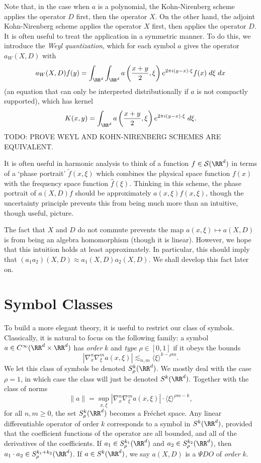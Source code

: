 Note that, in the case when $a$ is a polynomial, the Kohn-Nirenberg scheme applies the operator $D$ first, then the operator $X$. On the other hand, the adjoint Kohn-Nirenberg scheme applies the operator $X$ first, then applies the operator $D$. It is often useful to treat the application in a symmetric manner. To do this, we introduce the \emph{Weyl quantization}, which for each symbol $a$ gives the operator $a_W(X,D)$ with
%
\[ a_W(X,D) f(y) = \int_{\RR^d} \int_{\RR^d} a \left( \frac{x + y}{2}, \xi \right) e^{2 \pi i (y - x) \cdot \xi} f(x) \; d\xi\; dx \]
%
(an equation that can only be interpreted distributionally if $a$ is not compactly supported), which has kernel
%
\[ K(x,y) = \int_{\RR^d} a \left( \frac{x + y}{2}, \xi \right) e^{2 \pi i (y - x) \cdot \xi}\; d\xi. \]
%
TODO: PROVE WEYL AND KOHN-NIRENBERG SCHEMES ARE EQUIVALENT.

It is often useful in harmonic analysis to think of a function $f \in \mathcal{S}(\RR^d)$ in terms of a `phase portrait' $\tilde{f}(x,\xi)$ which combines the physical space function $f(x)$ with the frequency space function $\widehat{f}(\xi)$. Thinking in this scheme, the phase portrait of $a(X,D) f$ should be approximately $a(x,\xi) f(x,\xi)$, though the uncertainty principle prevents this from being much more than an intuitive, though useful, picture.

The fact that $X$ and $D$ do not commute prevents the map $a(x,\xi) \mapsto a(X,D)$ is from being an algebra homomorphism (though it is linear). However, we hope that this intuition holds at least approximately. In particular, this should imply that $(a_1a_2)(X,D) \approx a_1(X,D) a_2(X,D)$. We shall develop this fact later on.

\section{Symbol Classes}

To build a more elegant theory, it is useful to restrict our class of symbols. Classically, it is natural to focus on the following family: a symbol $a \in C^\infty(\RR^d \times \RR^d)$ has \emph{order} $k$ and \emph{type} $\rho \in [0,1]$ if it obeys the bounds
%
\[ |\nabla_x^n \nabla_\xi^m a(x,\xi)| \lesssim_{n,m} \langle \xi \rangle^{k - \rho m}. \]
%
We let this class of symbols be denoted $S_\rho^k(\RR^d)$. We mostly deal with the case $\rho = 1$, in which case the class will just be denoted $S^k(\RR^d)$. Together with the class of norms
%
\[ \| a \| = \sup_{x,\xi} |\nabla_x^n \nabla_\xi^m a(x,\xi)| \cdot \langle \xi \rangle^{\rho m - k}, \]
%
for all $n,m \geq 0$, the set $S^k_\rho(\RR^d)$ becomes a Fr\'{e}chet space. Any linear differentiable operator of order $k$ corresponds to a symbol in $S^k(\RR^d)$, provided that the coefficient functions of the operator are all bounded, and all of the derivatives of the coefficients. If $a_1 \in S^{k_1}_\rho(\RR^d)$ and $a_2 \in S^{k_2}_\rho(\RR^d)$, then $a_1 \cdot a_2 \in S^{k_1 + k_2}_\rho(\RR^d)$. If $a \in S^k(\RR^d)$, we say $a(X,D)$ is a $\Psi DO$ of \emph{order $k$}.

